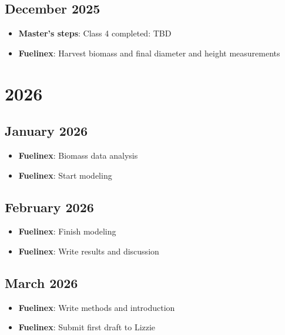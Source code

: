 \documentclass{article}
\begin{document}
\subsection*{December 2025}
\begin{itemize}
    \item \textbf{Master's steps}: Class 4 completed: TBD
    \item \textbf{Fuelinex}: Harvest biomass and final diameter and height measurements
\end{itemize}

\section*{\centering \Large 2026}

\subsection*{January 2026}
\begin{itemize}
    \item \textbf{Fuelinex}: Biomass data analysis
    \item \textbf{Fuelinex}: Start modeling
\end{itemize}

\subsection*{February 2026}
\begin{itemize}
    \item \textbf{Fuelinex}: Finish modeling
    \item \textbf{Fuelinex}: Write results and discussion
\end{itemize}

\subsection*{March 2026}
\begin{itemize}
    \item \textbf{Fuelinex}: Write methods and introduction
    \item \textbf{Fuelinex}: Submit first draft to Lizzie
\end{itemize}
\end{document}
